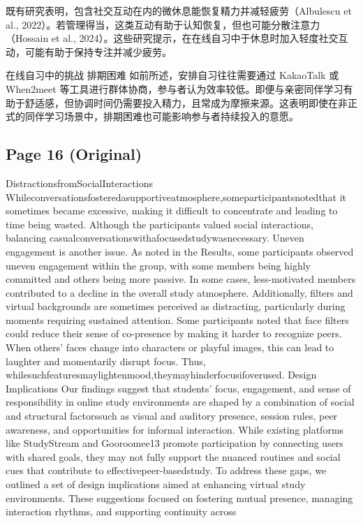 \documentclass[12pt]{ctexart}
\begin{document}
既有研究表明，包含社交互动在内的微休息能恢复精力并减轻疲劳（Albulescu et al., 2022）。若管理得当，这类互动有助于认知恢复，但也可能分散注意力（Hossain et al., 2024）。这些研究提示，在在线自习中于休息时加入轻度社交互动，可能有助于保持专注并减少疲劳。

在线自习中的挑战
排期困难
如前所述，安排自习往往需要通过 KakaoTalk 或 When2meet 等工具进行群体协商，参与者认为效率较低。即便与亲密同伴学习有助于舒适感，但协调时间仍需要投入精力，且常成为摩擦来源。这表明即使在非正式的同伴学习场景中，排期困难也可能影响参与者持续投入的意愿。

\subsection*{Page 16 (Original)}

DistractionsfromSocialInteractions
Whileconversationsfosteredasupportiveatmosphere,someparticipantsnotedthat
it sometimes became excessive, making it difficult to concentrate and leading to
time being wasted. Although the participants valued social interactions, balancing
casualconversationswithafocusedstudywasnecessary.
Uneven engagement is another issue. As noted in the Results, some
participants observed uneven engagement within the group, with some members
being highly committed and others being more passive. In some cases,
less-motivated members contributed to a decline in the overall study atmosphere.
Additionally, filters and virtual backgrounds are sometimes perceived as
distracting, particularly during moments requiring sustained attention. Some
participants noted that face filters could reduce their sense of co-presence by
making it harder to recognize peers. When others’ faces change into characters or
playful images, this can lead to laughter and momentarily disrupt focus. Thus,
whilesuchfeaturesmaylightenmood,theymayhinderfocusifoverused.
Design Implications
Our findings suggest that students’ focus, engagement, and sense of responsibility
in online study environments are shaped by a combination of social and structural
factorssuch as visual and auditory presence, session rules, peer awareness, and
opportunities for informal interaction. While existing platforms like StudyStream
and Gooroomee13 promote participation by connecting users with shared goals,
they may not fully support the nuanced routines and social cues that contribute to
effectivepeer-basedstudy.
To address these gaps, we outlined a set of design implications aimed at
enhancing virtual study environments. These suggestions focused on fostering
mutual presence, managing interaction rhythms, and supporting continuity across
\end{document}

